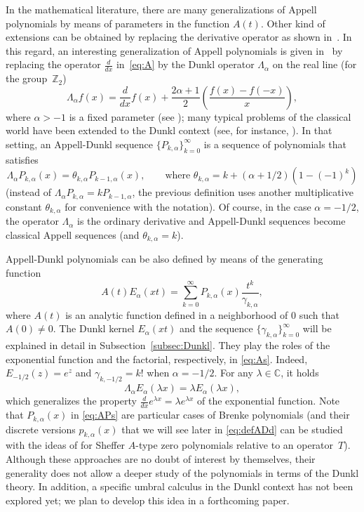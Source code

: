 \documentclass[11pt]{article}
\theoremstyle{plain}
\theoremstyle{remark}
\numberwithin{equation}{section} %
\newcommand{\Ea}{E_{\alpha}}
\newcommand{\La}{\Lambda_{\alpha}}
\newcommand{\CC}{\mathbb{C}}
\begin{document}
In the mathematical literature, there are many generalizations of Appell polynomials by means of parameters in the function $A(t)$. Other kind of extensions can be obtained by replacing the derivative operator as shown in~\cite{Cho}. In this regard, an interesting generalization of Appell polynomials is given in~\cite{CDPV} by replacing
the operator $\frac{d}{dx}$ in~\eqref{eq:A} by the Dunkl operator $\La$ on the real line (for the group~$\mathbb{Z}_2$)
\begin{equation}
\label{eq:La}
  \La f(x) = \frac{d}{dx}f(x) + \frac{2\alpha+1}{2}
  \left(\frac{f(x)-f(-x)}{x}\right),
\end{equation}
where $\alpha > -1$ is a fixed parameter (see \cite{Du, Ros});
many typical problems of the classical world have been extended to the Dunkl context
(see, for instance, \cite{ACV, AdJ, BCV, CRV, DW, Jeu, MO, MMN, NS, Rosler98, Rosler-LN, RosVo, ThX, Tr}). 
In that setting, an Appell-Dunkl sequence $\{P_{k,\alpha}\}_{k=0}^{\infty}$ is
a sequence of polynomials that satisfies
\begin{equation*}
  \La P_{k,\alpha}(x) = \theta_{k,\alpha} P_{k-1,\alpha}(x),
  \qquad \text {where } \theta_{k,\alpha} = k+(\alpha+1/2)(1-(-1)^k)
\end{equation*}
(instead of $\La P_{k,\alpha} = k P_{k-1,\alpha}$, the previous definition uses 
another multiplicative constant $\theta_{k,\alpha}$ for convenience with the notation). 
Of course, in the case $\alpha=-1/2$,
the operator $\La$ is the ordinary derivative and Appell-Dunkl sequences become
classical Appell sequences (and $\theta_{k,\alpha}=k$). 

Appell-Dunkl polynomials can be also defined by means of the generating function
\begin{equation}
\label{eq:APs}
  A(t)\Ea(xt) = \sum_{k=0}^\infty P_{k,\alpha}(x) \frac{t^k}{\gamma_{k,\alpha}},
\end{equation}
where $A(t)$ is an analytic function defined in a neighborhood of $0$ such that $A(0) \ne 0$. The Dunkl kernel $\Ea(xt)$ and the sequence $\{\gamma_{k,\alpha}\}_{k=0}^{\infty}$ will be explained in detail in Subsection~\ref{subsec:Dunkl}. They play the roles of the exponential function and the factorial, respectively, in \eqref{eq:As}. Indeed, $E_{-1/2}(z)=e^z$ and $\gamma_{k,-1/2}=k!$ when $\alpha=-1/2$. For any $\lambda\in\CC$, it holds
\[
  \La \Ea(\lambda x) = \lambda\Ea(\lambda x),
\]
which generalizes the property $\frac{d}{dx}e^{\lambda x} = \lambda e^{\lambda x}$ of the exponential function. 
Note that $P_{k,\alpha}(x)$ in \eqref{eq:APs} are particular cases of Brenke polynomials (and their discrete versions $p_{k,\alpha}(x)$ that we will see later in \eqref{eq:defADd} can be studied with the ideas of \cite[Theorem~10.1.4]{Ism} for Sheffer $A$-type zero polynomials relative to an operator~$T$). Although these approaches are no doubt of interest by themselves, their generality does not allow a deeper study of the polynomials in terms of the Dunkl theory. In addition, a specific umbral calculus in the Dunkl context has not been explored yet; we plan to develop this idea in a forthcoming paper.
\end{document}
